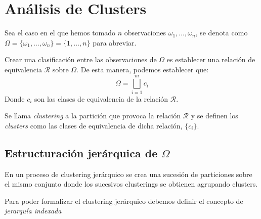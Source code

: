 \section{Análisis de Clusters}

\noindent Sea el caso en el que hemos tomado $n$ observaciones $\omega_1,\ldots, \omega_n$, se denota como $\Omega=\lbrace\omega_1,\ldots, \omega_n\rbrace=\lbrace 1,\ldots, n\rbrace$ para abreviar. 

\noindent Crear una clasificación entre las observaciones de $\Omega$ es establecer una relación de equivalencia $\mathcal{R}$ sobre $\Omega$. De esta manera, podemos establecer que:
\begin{equation}
\Omega=\bigsqcup_{i=1}^m c_i
\end{equation}
\noindent Donde $c_i$ son las clases de equivalencia de la relación $\mathcal{R}$.

\begin{defi}
Se llama \textit{clustering} a la partición que provoca la relación $\mathcal{R}$ y se definen los \textit{clusters} como las clases de equivalencia de dicha relación, $\lbrace c_i\rbrace$. 
\end{defi}

\subsection{Estructuración jerárquica de $\Omega$}\label{Estructuración jerárquica}

\noindent En un proceso de clustering jerárquico se crea una sucesión de particiones sobre el mismo conjunto donde los sucesivos clusterings se obtienen agrupando clusters.  

\noindent Para poder formalizar el clustering jerárquico debemos definir el concepto de \textit{jerarquía indexada}


